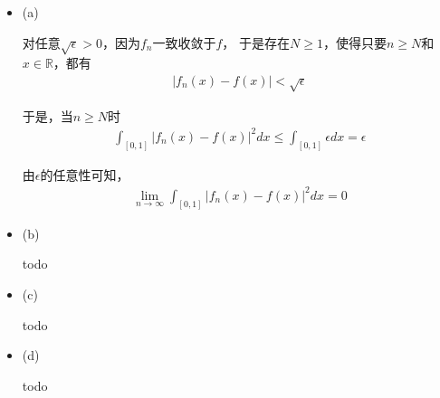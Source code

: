 \documentclass{article}
\begin{document}
\begin{itemize}
  \item (a)

        对任意$\sqrt{\epsilon} > 0$，因为$f_n$一致收敛于$f$，
        于是存在$N \geq 1$，使得只要$n \geq N$和$x \in \mathbb{R}$，都有
        \begin{align*}
          |f_n(x) - f(x)| < \sqrt{\epsilon}
        \end{align*}

        于是，当$n \geq N$时
        \begin{align*}
          \int_{[0, 1]} |f_n(x) - f(x)|^2 dx \leq \int_{[0, 1]} \epsilon dx = \epsilon
        \end{align*}

        由$\epsilon$的任意性可知，
        \begin{align*}
          \lim\limits_{n \to \infty} \int_{[0, 1]} |f_n(x) - f(x)|^2 dx = 0
        \end{align*}

  \item (b)

  todo

  \item (c)

  todo

  \item (d)

  todo

\end{itemize}
\end{document}
